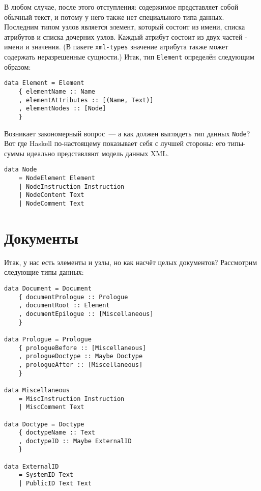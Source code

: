В любом случае, после этого отступления: содержимое представляет собой обычный текст, и потому у него также нет специального типа данных. Последним типом узлов является элемент, который состоит из имени, списка атрибутов и списка дочерних узлов. Каждый атрибут состоит из двух частей - имени и значения. (В пакете \lstinline!xml-types! значение атрибута также может содержать неразрешенные сущности.) Итак, тип \lstinline!Element! определён следующим образом:

\begin{lstlisting}
data Element = Element
    { elementName :: Name
    , elementAttributes :: [(Name, Text)]
    , elementNodes :: [Node]
    }
\end{lstlisting}

Возникает закономерный вопрос~--- а как должен выглядеть тип данных \lstinline!Node!? Вот где Haskell по-настоящему показывает себя с лучшей стороны: его типы-суммы идеально представляют модель данных XML. %

\begin{lstlisting}
data Node
    = NodeElement Element
    | NodeInstruction Instruction
    | NodeContent Text
    | NodeComment Text
\end{lstlisting}

\section{Документы} %

Итак, у нас есть элементы и узлы, но как насчёт целых документов? Рассмотрим следующие типы данных:

\begin{lstlisting}
data Document = Document
    { documentPrologue :: Prologue
    , documentRoot :: Element
    , documentEpilogue :: [Miscellaneous]
    }

data Prologue = Prologue
    { prologueBefore :: [Miscellaneous]
    , prologueDoctype :: Maybe Doctype
    , prologueAfter :: [Miscellaneous]
    }

data Miscellaneous
    = MiscInstruction Instruction
    | MiscComment Text

data Doctype = Doctype
    { doctypeName :: Text
    , doctypeID :: Maybe ExternalID
    }

data ExternalID
    = SystemID Text
    | PublicID Text Text
\end{lstlisting}

